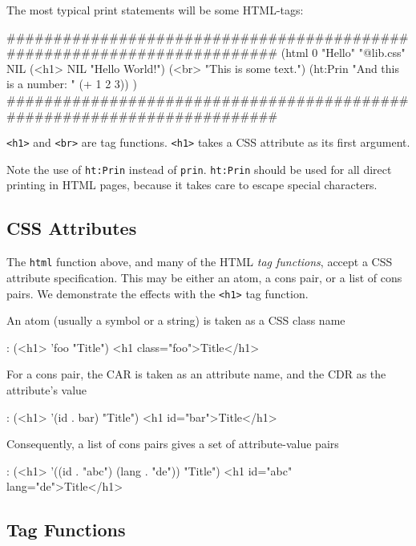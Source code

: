 The most typical print statements will be some HTML-tags:


\begin{wideverbatim}
########################################################################
(html 0 "Hello" "@lib.css" NIL
   (<h1> NIL "Hello World!")
   (<br> "This is some text.")
   (ht:Prin "And this is a number: " (+ 1 2 3)) )
########################################################################
\end{wideverbatim}

\texttt{<h1>} and \texttt{<br>} are tag functions. \texttt{<h1>} takes a CSS attribute as its
first argument.

Note the use of \texttt{ht:Prin} instead of \texttt{prin}. \texttt{ht:Prin} should be used
for all direct printing in HTML pages, because it takes care to escape
special characters.

 
\subsection{CSS Attributes}
\label{sec:appl-devel-css-attributes}

The \texttt{html} function above, and many of the HTML
\emph{tag functions}, accept a CSS attribute specification. This may
be either an atom, a cons pair, or a list of cons pairs. We demonstrate
the effects with the \texttt{<h1>} tag function.

An atom (usually a symbol or a string) is taken as a CSS class name


\begin{wideverbatim}
: (<h1> 'foo "Title")
<h1 class="foo">Title</h1>
\end{wideverbatim}

For a cons pair, the CAR is taken as an attribute name, and the CDR as
the attribute's value


\begin{wideverbatim}
: (<h1> '(id . bar) "Title")
<h1 id="bar">Title</h1>
\end{wideverbatim}

Consequently, a list of cons pairs gives a set of attribute-value pairs


\begin{wideverbatim}
: (<h1> '((id . "abc") (lang . "de")) "Title")
<h1 id="abc" lang="de">Title</h1>
\end{wideverbatim}

 
\subsection{Tag Functions}
\label{sec:appl-devel-tag-functions}


